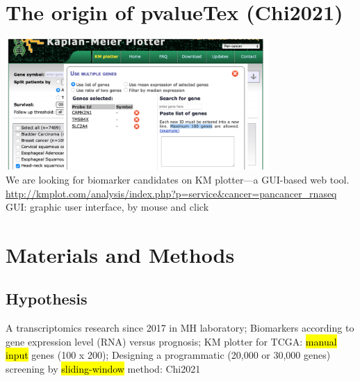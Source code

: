 \documentclass[
paper=landscape,
paper=160mm:90mm, %
fontsize=11pt, %
pagesize, %
parskip=half-, %
]{scrartcl} %
\theoremstyle{mythmstyle} %
\begin{document}
\clearpage
\section{The origin of pvalueTex (Chi2021)}

\includegraphics[width=10cm]{KM_plotter2021.jpg}\\
We are looking for biomarker candidates on KM plotter---a GUI-based web tool.\\
{\tiny \url{http://kmplot.com/analysis/index.php?p=service&cancer=pancancer_rnaseq}\\
GUI: graphic user interface, by mouse and click}

\clearpage
%
\section{Materials and Methods} %
\subsection{Hypothesis} 
\begin{outline}

\1 A transcriptomics research since 2017 in MH laboratory;
\1 Biomarkers according to gene expression level (RNA) versus prognosis;
\1 KM plotter for TCGA: \hl{manual input} genes (100 x 200);
\1 Designing a programmatic (20,000 or 30,000 genes) screening by \hl{sliding-window} method: Chi2021
\end{outline}

\thispagestyle{headings}
\end{document}
